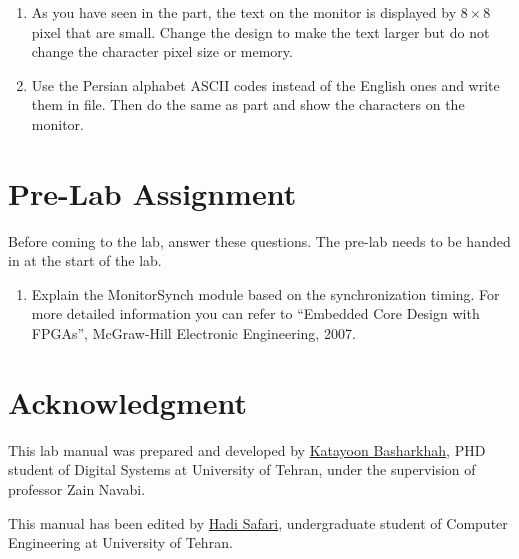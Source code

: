 \documentclass[12pt, logo=tehranDLDL/ut]{tehranDLDL}
\begin{document}
\begin{enumerate}
    \item As you have seen in the  part, the text on the monitor is displayed by $8\times8$ pixel that are small. Change the design to make the text larger but do not change the character pixel size or memory.
    \item Use the Persian alphabet ASCII codes instead of the English ones and write them in  file. Then do the same as  part and show the characters on the monitor.
\end{enumerate}

\designverification{}

\section*{Pre-Lab Assignment}
Before coming to the lab, answer these questions. The pre-lab needs to be handed in at the start of the lab.

\begin{enumerate}
    \item Explain the MonitorSynch module based on the  synchronization timing.
    For more detailed information you can refer to
    ``Embedded Core Design with FPGAs'', McGraw-Hill Electronic Engineering, 2007.
\end{enumerate}


\section*{Acknowledgment}

This lab manual was prepared and developed by \href{mailto:ktbasharkhah@gmail.com?subject=[DLDLab]\%20}{Katayoon Basharkhah}, PHD student of Digital Systems at University of Tehran, under the supervision of professor Zain Navabi.

This manual has been edited by \href{mailto:hadi.safari@ut.ac.ir?subject=[DLDLab]\%20}{Hadi Safari}, undergraduate student of Computer Engineering at University of Tehran.
\end{document}
